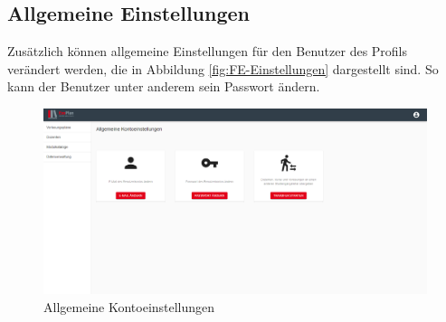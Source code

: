 \subsection{Allgemeine Einstellungen}
Zusätzlich können allgemeine Einstellungen für den Benutzer des Profils verändert werden, die in Abbildung \vref{fig:FE-Einstellungen} dargestellt sind.
So kann der Benutzer unter anderem sein Passwort ändern.
\begin{figure}[H]
	\centering 
	\includegraphics[width=\textwidth]{img/FrontEnd/Einstellungen.png}
	\caption[Allgemeine Kontoeinstellungen]{\label{fig:FE-Einstellungen}Allgemeine Kontoeinstellungen}
\end{figure}
